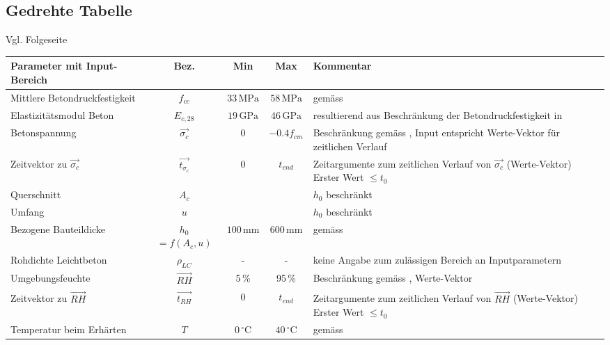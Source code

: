 \subsection{Gedrehte Tabelle} \label{refGedrehteTab}%
%
Vgl. Folgeseite%
\newpage%
%
\begin{sidewaystable}
\setlength{\tabcolsep}{4.0pt}
\begin{table} [H]
 \begin{center}
\begin{tabularx}{150mm}{ l c c c X }
\hline 
\textbf{Parameter mit Input-Bereich} & \textbf{Bez.} & \textbf{Min} & \textbf{Max} & \textbf{Kommentar} \\
\hline 
Mittlere Betondruckfestigkeit & $f_{cc}$ & $33\,\textrm{MPa}$ & $58\,\textrm{MPa}$ & gemäss \cite{siadoku0192,eurocode2}  \\ 
Elastizitätsmodul Beton & $E_{c,28}$ & $19\,\textrm{GPa}$ & $46\,\textrm{GPa}$ & resultierend aus Beschränkung der Betondruckfestigkeit in \newline \cite{siadoku0192,eurocode2}\\ 
Betonspannung& $\vec{\sigma_{c}}$ & $0$ & $-0.4f_{cm}$ & Beschränkung gemäss \cite{siadoku0192}, \newline Input entspricht Werte-Vektor für zeitlichen Verlauf  \\ 
Zeitvektor zu $\vec{\sigma_{c}}$ & $\vec{t_{\sigma_{c}}}$ & 0 & $t_{end}$ & Zeitargumente zum zeitlichen Verlauf von $\vec{\sigma_{c}}$ (Werte-Vektor) \newline Erster Wert $\le t_0$ \\
Querschnitt & $A_{c}$ &  &  & $h_0$ beschränkt \\ 
Umfang & $u$ & &  & $h_0$ beschränkt \\ 
Bezogene Bauteildicke & $h_0$ \footnotesize{$=f(A_c,u)$} & $100\,\textrm{mm}$ & $600\,\textrm{mm}$ & gemäss \cite{siadoku0192,eurocode2} \\  
Rohdichte Leichtbeton& $\rho_{LC}$ & - & - & keine Angabe zum zulässigen \newline  Bereich an Inputparametern  \\ 
Umgebungsfeuchte & $\vec{RH}$ & 5\,\% & 95\,\% & Beschränkung gemäss \cite{siadoku0192,eurocode2}, \newline Werte-Vektor \\ 
Zeitvektor zu $\vec{RH}$ & $\vec{t_{RH}}$ & 0 & $t_{end}$ & Zeitargumente zum zeitlichen Verlauf von $\vec{RH}$ (Werte-Vektor) \newline Erster Wert $\le t_0$ \\
Temperatur beim Erhärten & $T$ & $0\,^{\circ}\mathrm{C}$ & $40\,^{\circ}\mathrm{C}$ & gemäss \cite{siadoku0192,eurocode2}  \\
\hline
\end{tabularx}
\end{center}    
\label{tabelle1b}
\end{table}
\end{sidewaystable}
%
%
%
%
%
%
%
%
%
%
